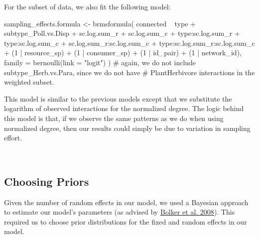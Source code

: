 \documentclass[11pt,]{article}
\newenvironment{Shaded}{}{}
\newcommand{\KeywordTok}[1]{\textcolor[rgb]{0.00,0.00,1.00}{#1}}
\newcommand{\DataTypeTok}[1]{#1}
\newcommand{\DecValTok}[1]{#1}
\newcommand{\StringTok}[1]{\textcolor[rgb]{0.00,0.50,0.50}{#1}}
\newcommand{\CommentTok}[1]{\textcolor[rgb]{0.00,0.50,0.00}{#1}}
\newcommand{\OperatorTok}[1]{#1}
\newcommand{\NormalTok}[1]{#1}
\begin{document}
For the subset of data, we also fit the following model:

\begin{Shaded}
\begin{Highlighting}[]
\NormalTok{sampling_effects.formula <-}\StringTok{ }\KeywordTok{brmsformula}\NormalTok{(}
\NormalTok{  connected }\OperatorTok{~}\StringTok{ }\NormalTok{type }\OperatorTok{+}\StringTok{ }\NormalTok{subtype_Poll.vs.Disp }\OperatorTok{+}\StringTok{ }\NormalTok{sc.log.sum_r }\OperatorTok{+}\StringTok{ }\NormalTok{sc.log.sum_c }\OperatorTok{+}\StringTok{ }
\StringTok{    }\NormalTok{type}\OperatorTok{:}\NormalTok{sc.log.sum_r }\OperatorTok{+}\StringTok{ }\NormalTok{type}\OperatorTok{:}\NormalTok{sc.log.sum_c }\OperatorTok{+}\StringTok{ }\NormalTok{sc.log.sum_r}\OperatorTok{:}\NormalTok{sc.log.sum_c }\OperatorTok{+}
\StringTok{    }\NormalTok{type}\OperatorTok{:}\NormalTok{sc.log.sum_r}\OperatorTok{:}\NormalTok{sc.log.sum_c }\OperatorTok{+}
\StringTok{    }\NormalTok{(}\DecValTok{1} \OperatorTok{|}\StringTok{ }\NormalTok{resource_sp) }\OperatorTok{+}\StringTok{ }\NormalTok{(}\DecValTok{1} \OperatorTok{|}\StringTok{ }\NormalTok{consumer_sp) }\OperatorTok{+}\StringTok{ }\NormalTok{(}\DecValTok{1} \OperatorTok{|}\StringTok{ }\NormalTok{id_pair) }\OperatorTok{+}\StringTok{ }\NormalTok{(}\DecValTok{1} \OperatorTok{|}\StringTok{ }\NormalTok{network_id),}
  \DataTypeTok{family =} \KeywordTok{bernoulli}\NormalTok{(}\DataTypeTok{link =} \StringTok{"logit"}\NormalTok{)}
\NormalTok{) }\CommentTok{# again, we do not include subtype_Herb.vs.Para, since we do not have}
\CommentTok{# PlantHerbivore interactions in the weighted subset.}
\end{Highlighting}
\end{Shaded}

This model is similar to the previous models except that we substitute
the logarithm of observed interactions for the normalized degree. The
logic behind this model is that, if we observe the same patterns as we
do when using normalized degree, then our results could simply be due to
variation in sampling effort.

~

\subsection{Choosing Priors}\label{choosing-priors}

Given the number of random effects in our model, we used a Bayesian
approach to estimate our model's parameters (as advised by
\href{https://www.sciencedirect.com/science/article/pii/S0169534709000196}{Bolker
et al. 2008}). This required us to choose prior distributions for the
fixed and random effects in our model.
\end{document}
